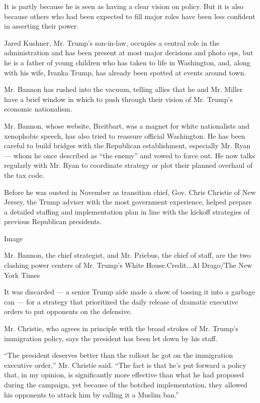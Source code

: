 It is partly because he is seen as having a clear vision on policy. But
it is also because others who had been expected to fill major roles have
been less confident in asserting their power.

Jared Kushner, Mr. Trump's son-in-law, occupies a central role in the
administration and has been present at most major decisions and photo
ops, but he is a father of young children who has taken to life in
Washington, and, along with his wife, Ivanka Trump, has already been
spotted at events around town.

Mr. Bannon has rushed into the vacuum, telling allies that he and Mr.
Miller have a brief window in which to push through their vision of Mr.
Trump's economic nationalism.

Mr. Bannon, whose website, Breitbart, was a magnet for white
nationalists and xenophobic speech, has also tried to reassure official
Washington. He has been careful to build bridges with the Republican
establishment, especially Mr. Ryan --- whom he once described as ``the
enemy'' and vowed to force out. He now talks regularly with Mr. Ryan to
coordinate strategy or plot their planned overhaul of the tax code.

Before he was ousted in November as transition chief, Gov. Chris
Christie of New Jersey, the Trump adviser with the most government
experience, helped prepare a detailed staffing and implementation plan
in line with the kickoff strategies of previous Republican presidents.

Image

Mr. Bannon, the chief strategist, and Mr. Priebus, the chief of staff,
are the two clashing power centers of Mr. Trump's White
House.Credit...Al Drago/The New York Times

It was discarded --- a senior Trump aide made a show of tossing it into
a garbage can --- for a strategy that prioritized the daily release of
dramatic executive orders to put opponents on the defensive.

Mr. Christie, who agrees in principle with the broad strokes of Mr.
Trump's immigration policy, says the president has been let down by his
staff.

``The president deserves better than the rollout he got on the
immigration executive order,'' Mr. Christie said. ``The fact is that
he's put forward a policy that, in my opinion, is significantly more
effective than what he had proposed during the campaign, yet because of
the botched implementation, they allowed his opponents to attack him by
calling it a Muslim ban.''

